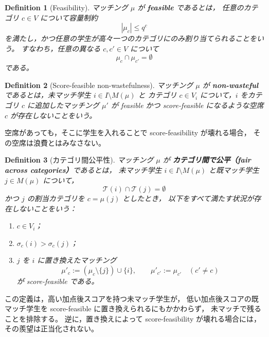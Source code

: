 \documentclass[
  12pt,
  a4paper,
  oneside,
  onecolumn,
  titlepage,
  final
]{jsarticle}
\newtheorem{definition}{Definition}
\newcommand{\1}{\mathbf{1}}
\begin{document}
\begin{definition}[Feasibility]
\label{def:capacity-feasibility}
マッチング $\mu$ が \textbf{feasible} であるとは，
任意のカテゴリ $c\in V$ について容量制約
\[
    |\mu_c|\leq q^c
\]
を満たし，かつ任意の学生が高々一つのカテゴリにのみ割り当てられることをいう。
すなわち，任意の異なる $c,c'\in V$ について
\[
    \mu_c\cap\mu_{c'}=\emptyset
\]
である。
\end{definition}

\begin{definition}[Score-feasible non-wastefulness]
\label{def:score-feasible-nonwastefulness}
マッチング $\mu$ が
\textbf{non-wasteful} であるとは，未マッチ学生 $i\in I\setminus M(\mu)$ と
カテゴリ $c\in V_i$ について，$i$ をカテゴリ $c$ に追加したマッチング $\mu'$ が
feasible かつ score-feasible になるような空席 $c$ が存在しないことをいう。
\end{definition}

\noindent
空席があっても，そこに学生を入れることで score-feasibility が壊れる場合，
その空席は浪費とはみなさない。

\begin{definition}[カテゴリ間公平性]
\label{def:across-category-fairness}
マッチング $\mu$ が
\textbf{カテゴリ間で公平（fair across categories）}であるとは，
未マッチ学生 $i\in I\setminus M(\mu)$ と既マッチ学生 $j\in M(\mu)$ について，
\[
    \mathcal T(i)\cap \mathcal T(j)=\emptyset
\]
かつ $j$ の割当カテゴリを $c=\mu(j)$ としたとき，
以下をすべて満たす状況が存在しないことをいう：
\begin{enumerate}
    \item $c\in V_i$；
    \item $\sigma_c(i)>\sigma_c(j)$；
    \item $j$ を $i$ に置き換えたマッチング
    \[
        \mu'_c:=(\mu_c\setminus\{j\})\cup\{i\},
        \qquad
        \mu'_{c'}:=\mu_{c'}\quad(c'\neq c)
    \]
    が score-feasible である。
\end{enumerate}
\end{definition}

\noindent
この定義は，高い加点後スコアを持つ未マッチ学生が，
低い加点後スコアの既マッチ学生を score-feasible に置き換えられるにもかかわらず，
未マッチで残ることを排除する。
逆に，置き換えによって score-feasibility が壊れる場合には，
その羨望は正当化されない。
\end{document}
